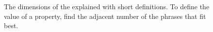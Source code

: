 \begin{figure}
\fi
\caption{The dimensions of the \EP explained with short
  definitions. To define the value of a property, find the adjacent
  number of the phrases that fit best.}\label{fig:engagementprofile}
\end{figure}
